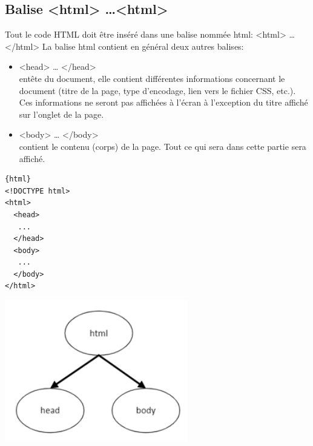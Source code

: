 \documentclass[a4paper,11pt]{article}
\begin{document}
\subsection{Balise <html> \dots <html>}
Tout le code HTML doit être inséré dans une balise nommée html: <html> … </html>
La balise html contient en général deux autres balises:
\begin{itemize}
\item <head> … </head>\\
entête du document, elle contient différentes informations concernant le document (titre de la page, type d'encodage, lien vers le fichier CSS, etc.).
Ces informations ne seront pas affichées à l'écran à l'exception du titre affiché sur l'onglet de la page.
\item <body> … </body>\\
contient le contenu (corps) de la page. Tout ce qui sera dans cette partie sera affiché.
\end{itemize}
\begin{multicols}{2}
\begin{verbatim}{html}
<!DOCTYPE html>
<html>
  <head>
   ...
  </head>
  <body>
   ...
  </body>
</html>
\end{verbatim}
\includegraphics[width=0.6\textwidth]{images/balise-html.png} \\
\end{multicols}

\newpage
\end{document}
